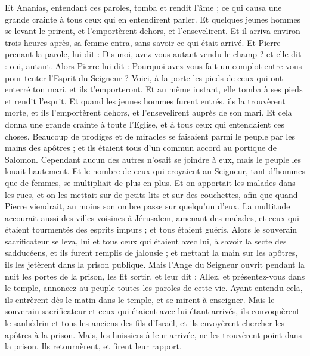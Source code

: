 \begin{multicols}{2}
Et Ananias, entendant ces paroles, tomba et rendit l'âme ; ce qui causa une grande crainte à tous ceux qui en entendirent parler.
Et quelques jeunes hommes se levant le prirent, et l'emportèrent dehors, et l'ensevelirent.
Et il arriva environ trois heures après, sa femme entra, sans savoir ce qui était arrivé.
Et Pierre prenant la parole, lui dit : Dis-moi, avez-vous autant vendu le champ ? et elle dit : oui, autant.
Alors Pierre lui dit : Pourquoi avez-vous fait un complot entre vous pour tenter l'Esprit du Seigneur ? Voici, à la porte les pieds de ceux qui ont enterré ton mari, et ils t'emporteront.
Et au même instant, elle tomba à ses pieds et rendit l'esprit. Et quand les jeunes hommes furent entrés, ils la trouvèrent morte, et ils l'emportèrent dehors, et l'ensevelirent auprès de son mari.
Et cela donna une grande crainte à toute l'Eglise, et à tous ceux qui entendaient ces choses.
Beaucoup de prodiges et de miracles se faisaient parmi le peuple par les mains des apôtres ; et ils étaient tous d'un commun accord au portique de Salomon.
Cependant aucun des autres n'osait se joindre à eux, mais le peuple les louait hautement.
Et le nombre de ceux qui croyaient au Seigneur, tant d'hommes que de femmes, se multipliait de plus en plus.
Et on apportait les malades dans les rues, et on les mettait sur de petits lits et sur des couchettes, afin que quand Pierre viendrait, au moins son ombre passe sur quelqu'un d'eux.
La multitude accourait aussi des villes voisines à Jérusalem, amenant des malades, et ceux qui étaient tourmentés des esprits impurs ; et tous étaient guéris.
Alors le souverain sacrificateur se leva, lui et tous ceux qui étaient avec lui, à savoir la secte des sadducéens, et ils furent remplis de jalousie ;
et mettant la main sur les apôtres, ils les jetèrent dans la prison publique.
Mais l'Ange du Seigneur ouvrit pendant la nuit les portes de la prison, les fit sortir, et leur dit :
Allez, et présentez-vous dans le temple, annoncez au peuple toutes les paroles de cette vie.
Ayant entendu cela, ils entrèrent dès le matin dans le temple, et se mirent à enseigner. Mais le souverain sacrificateur et ceux qui étaient avec lui étant arrivés, ils convoquèrent le sanhédrin et tous les anciens des fils d'Israël, et ils envoyèrent chercher les apôtres à la prison.
Mais, les huissiers à leur arrivée, ne les trouvèrent point dans la prison. Ils retournèrent, et firent leur rapport,

\end{multicols}
